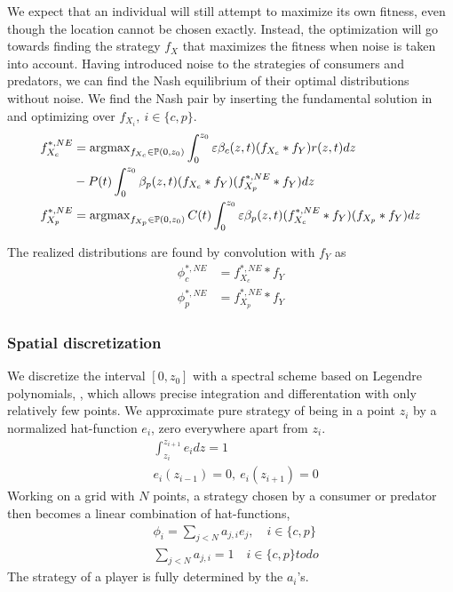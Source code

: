 We expect that an individual will still attempt to maximize its own fitness, even though the location cannot be chosen exactly. Instead, the optimization will go towards finding the strategy $f_X$ that maximizes the fitness when noise is taken into account.
Having introduced noise to the strategies of consumers and predators, we can find the Nash equilibrium of their optimal distributions without noise. We find the Nash pair by inserting the fundamental solution in  and optimizing over $f_{X_i},~i\in \{c, p\}$.
\begin{align*}
	f_{X_c}^{*,NE} &=  \operatorname{argmax}_{f_{X_c} \in \mathbb{P}(0,z_0)}  \int_0^{z_0} \varepsilon \beta_c(z,t)(f_{X_c} * f_Y) r(z,t) dz \\ & -  P(t)\int_0^{z_0} \beta_p(z,t) (f_{X_c} * f_Y)(f_{X_p}^{*,NE} * f_Y) dz \\
	f_{X_p}^{*,NE} &=  \operatorname{argmax}_{f_{X_p} \in \mathbb{P}(0,z_0)}C(t) \int_0^{z_0} \varepsilon \beta_p(z,t)(f_{X_c}^{*,NE}  * f_Y)(f_{X_p}* f_Y) dz
\end{align*}

The realized distributions are found by convolution with $f_Y$ as
\begin{align*}
  \phi_c^{*,NE} &= f_{X_c}^{*,NE} * f_Y \\
  \phi_p^{*,NE} &= f_{X_p}^{*,NE} * f_Y
\end{align*}

\subsubsection*{Spatial discretization}
We discretize the interval $[0,z_0]$ with a spectral scheme based on Legendre polynomials, \citep{kopriva2009implementing}, which allows precise integration and differentation with only relatively few points.
We approximate pure strategy of being in a point $z_i$  by a normalized hat-function $e_i$, zero everywhere apart from $z_i$.
\begin{align*}
	& \int_{z_i}^{z_{i+1}} e_i dz = 1 \\
	&e_i(z_{i-1}) = 0,~ e_i(z_{i+1}) = 0
\end{align*}
Working on a grid with $N$ points, a strategy chosen by a consumer or predator then becomes a linear combination of hat-functions,
\begin{align*}
  &\phi_{i} = \sum_{j<N} a_{j,i} e_j, \quad i\in \{c,p\} \\
  &\sum_{j<N} a_{j,i} = 1 \quad i\in \{c,p\}todo
\end{align*}
The strategy of a player is fully determined by the $a_i$'s.

